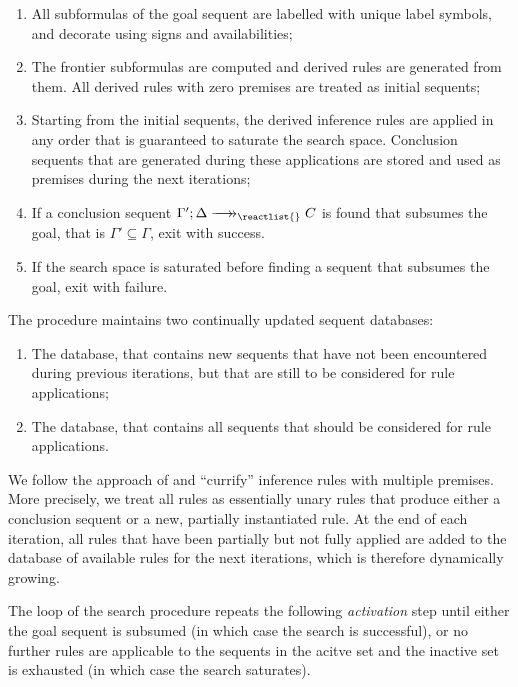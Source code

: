 \begin{enumerate}
\item All subformulas of the goal sequent are labelled with unique label
  symbols, and decorate using signs and availabilities;
\item The frontier subformulas are computed and derived rules are generated from
  them. All derived rules with zero premises are treated as initial sequents;
\item Starting from the initial sequents, the derived inference rules are
  applied in any order that is guaranteed to saturate the search
  space. Conclusion sequents that are generated during these applications are
  stored and used as premises during the next iterations;
\item If a conclusion sequent $\zfneuseq{\Gamma'}{\Delta}{\reactlist{}}{C}$ is
  found that subsumes the goal, that is $\Gamma' \subseteq \Gamma$, exit with
  success.
\item If the search space is saturated before finding a sequent that subsumes
  the goal, exit with failure.
\end{enumerate}

The procedure maintains two continually updated sequent databases:

\begin{enumerate}
\item The  database, that contains new sequents that have not
  been encountered during previous iterations, but that are still to be
  considered for rule applications;
\item The  database, that contains all sequents that
  should be considered for rule applications.
\end{enumerate}

We follow the approach of \cite{chaudhuri-thesis} and ``currify'' inference
rules with multiple premises. More precisely, we treat all rules as essentially
unary rules that produce either a conclusion sequent or a new, partially
instantiated rule. At the end of each iteration, all rules that have been
partially but not fully applied are added to the database of available rules for
the next iterations, which is therefore dynamically growing.

The loop of the search procedure repeats the following \emph{activation}
step until either the goal sequent is subsumed (in which case the search is
successful), or no further rules are applicable to the sequents in the acitve
set and the inactive set is exhausted (in which case the search saturates).

